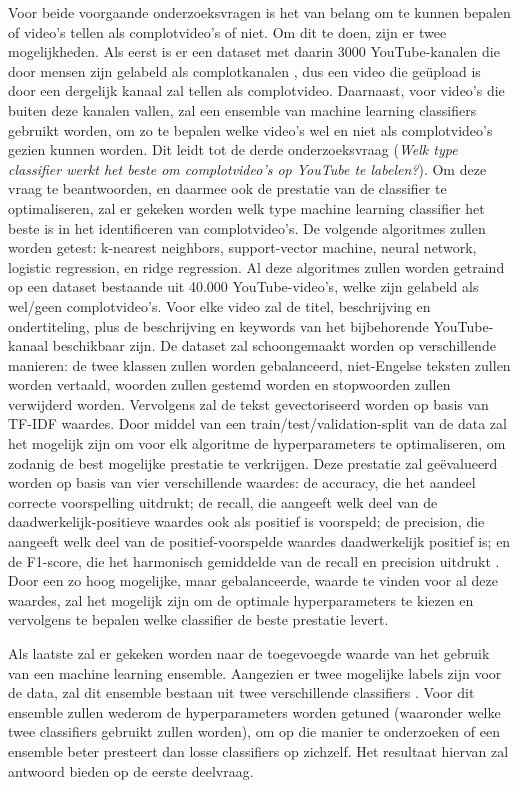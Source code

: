 \documentclass{uva-inf-article}
\begin{document}
Voor beide voorgaande onderzoeksvragen is het van belang om te kunnen bepalen of video's tellen als complotvideo's of niet. Om dit te doen, zijn er twee mogelijkheden. Als eerst is er een dataset met daarin 3000 YouTube-kanalen die door mensen zijn gelabeld als complotkanalen \citep{ledwich2019algorithmic}, dus een video die geüpload is door een dergelijk kanaal zal tellen als complotvideo. Daarnaast, voor video’s die buiten deze kanalen vallen, zal een ensemble van machine learning classifiers gebruikt worden, om zo te bepalen welke video’s wel en niet als complotvideo’s gezien kunnen worden. Dit leidt tot de derde onderzoeksvraag (\textit{Welk type classifier werkt het beste om complotvideo’s op YouTube te labelen?}). Om deze vraag te beantwoorden, en daarmee ook de prestatie van de classifier te optimaliseren, zal er gekeken worden welk type machine learning classifier het beste is in het identificeren van complotvideo’s. De volgende algoritmes zullen worden getest: k-nearest neighbors, support-vector machine, neural network, logistic regression, en ridge regression. Al deze algoritmes zullen worden getraind op een dataset bestaande uit 40.000 YouTube-video’s, welke zijn gelabeld als wel/geen complotvideo’s. Voor elke video zal de titel, beschrijving en ondertiteling, plus de beschrijving en keywords van het bijbehorende YouTube-kanaal beschikbaar zijn. De dataset zal schoongemaakt worden op verschillende manieren: de twee klassen zullen worden gebalanceerd, niet-Engelse teksten zullen worden vertaald, woorden zullen gestemd worden en stopwoorden zullen verwijderd worden. Vervolgens zal de tekst gevectoriseerd worden op basis van TF-IDF waardes. Door middel van een train/test/validation-split van de data zal het mogelijk zijn om voor elk algoritme de hyperparameters te optimaliseren, om zodanig de best mogelijke prestatie te verkrijgen. Deze prestatie zal geëvalueerd worden op basis van vier verschillende waardes: de accuracy, die het aandeel correcte voorspelling uitdrukt; de recall, die aangeeft welk deel van de daadwerkelijk-positieve waardes ook als positief is voorspeld; de precision, die aangeeft welk deel van de positief-voorspelde waardes daadwerkelijk positief is; en de F1-score, die het harmonisch gemiddelde van de recall en precision uitdrukt \citep{sokolova2009systematic}. Door een zo hoog mogelijke, maar gebalanceerde, waarde te vinden voor al deze waardes, zal het mogelijk zijn om de optimale hyperparameters te kiezen en vervolgens te bepalen welke classifier de beste prestatie levert.

Als laatste zal er gekeken worden naar de toegevoegde waarde van het gebruik van een machine learning ensemble. Aangezien er twee mogelijke labels zijn voor de data, zal dit ensemble bestaan uit twee verschillende classifiers \citep{bonab2016theoretical, bonab2017less}. Voor dit ensemble zullen wederom de hyperparameters worden getuned (waaronder welke twee classifiers gebruikt zullen worden), om op die manier te onderzoeken of een ensemble beter presteert dan losse classifiers op zichzelf. Het resultaat hiervan zal antwoord bieden op de eerste deelvraag.
\end{document}
